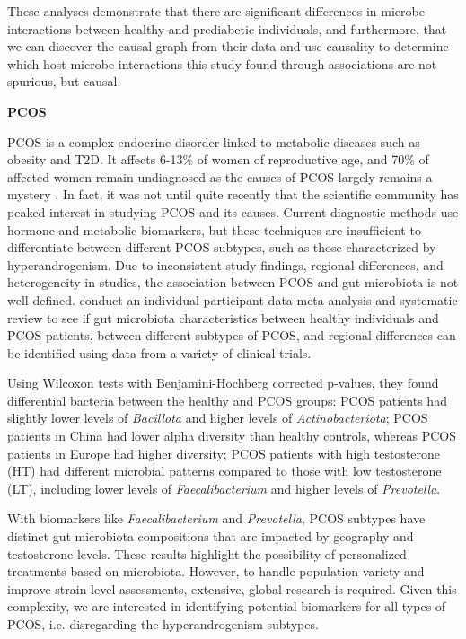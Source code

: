 \documentclass[12pt,letterpaper]{article}
\begin{document}
These analyses demonstrate that there are significant differences in microbe interactions between healthy and prediabetic individuals, and furthermore, that we can discover the causal graph from their data and use causality to determine which host-microbe interactions this study found through associations are not spurious, but causal. \newline

\textbf{PCOS}

PCOS is a complex endocrine disorder linked to metabolic diseases such as obesity and T2D. It affects 6-13\% of women of reproductive age, and 70\% of affected women remain undiagnosed as the causes of PCOS largely remains a mystery \citep{who2025pcos}. In fact, it was not until quite recently that the scientific community has peaked interest in studying PCOS and its causes. Current diagnostic methods use hormone and metabolic biomarkers, but these techniques are insufficient to differentiate between different PCOS subtypes, such as those characterized by hyperandrogenism. Due to inconsistent study findings, regional differences, and heterogeneity in studies, the association between PCOS and gut microbiota is not well-defined. \citep{yang2024pcos} conduct an individual participant data meta-analysis and systematic review to see if gut microbiota characteristics between healthy individuals and PCOS patients, between different subtypes of PCOS, and regional differences can be identified using data from a variety of clinical trials.

Using Wilcoxon tests with Benjamini-Hochberg corrected p-values, they found differential bacteria between the healthy and PCOS groups: PCOS patients had slightly lower levels of \textit{Bacillota} and higher levels of \textit{Actinobacteriota}; PCOS patients in China had lower alpha diversity than healthy controls, whereas PCOS patients in Europe had higher diversity; PCOS patients with high testosterone (HT) had different microbial patterns compared to those with low testosterone (LT), including lower levels of \textit{Faecalibacterium} and higher levels of \textit{Prevotella}. 

With biomarkers like \textit{Faecalibacterium} and \textit{Prevotella}, PCOS subtypes have distinct gut microbiota compositions that are impacted by geography and testosterone levels. These results highlight the possibility of personalized treatments based on microbiota. However, to handle population variety and improve strain-level assessments, extensive, global research is required. Given this complexity, we are interested in identifying potential biomarkers for all types of PCOS, i.e. disregarding the hyperandrogenism subtypes. \newline
\end{document}
